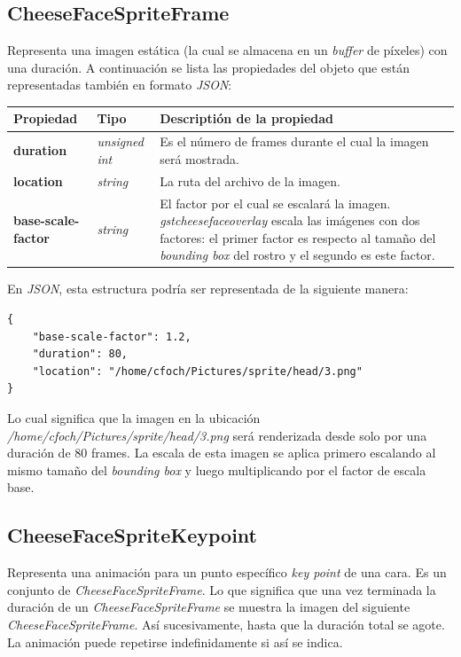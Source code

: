 \documentclass[a4paper,openright,12pt]{report}
\begin{document}
\subsection{CheeseFaceSpriteFrame}
Representa una imagen estática (la cual se almacena en un \textit{buffer} de
píxeles) con una duración. A continuación se lista las propiedades del objeto
que están representadas también en formato \textit{JSON}:

\begin{center}
  \begin{longtable}{| p{} | p{} | p{} |}
  \hline

  \textbf{Propiedad} &
  \textbf{Tipo} &
  \textbf{Descriptión de la propiedad}
  \\ \hline

  \textbf{duration} &
  \textit{unsigned int} &
  Es el número de frames durante el cual la imagen será mostrada.
  \\ \hline

  \textbf{location} &
  \textit{string} &
  La ruta del archivo de la imagen.
  \\ \hline

  \textbf{base-scale-factor} &
  \textit{string} &
  El factor por el cual se escalará la imagen. \textit{gstcheesefaceoverlay}
  escala las imágenes con dos factores: el primer factor es respecto al tamaño
  del \textit{bounding box} del rostro y el segundo es este factor.
  \\ \hline
  \end{longtable}
\end{center}

En \textit{JSON}, esta estructura podría ser representada de la siguiente
manera:\\
\begin{verbatim}
{
    "base-scale-factor": 1.2,
    "duration": 80,
    "location": "/home/cfoch/Pictures/sprite/head/3.png"
}
\end{verbatim}

Lo cual significa que la imagen en la ubicación
\textit{/home/cfoch/Pictures/sprite/head/3.png} será renderizada desde solo por
una duración de 80 frames. La escala de esta imagen se aplica primero escalando
al mismo tamaño del \textit{bounding box} y luego multiplicando por el factor de
escala base.\\

\subsection{CheeseFaceSpriteKeypoint}
Representa una animación para un punto específico \textit{key point} de una
cara. Es un conjunto de \textit{CheeseFaceSpriteFrame}. Lo que significa que una
vez terminada la duración de un \textit{CheeseFaceSpriteFrame} se muestra la
imagen del siguiente \textit{CheeseFaceSpriteFrame}. Así sucesivamente, hasta
que la duración total se agote. La animación puede repetirse indefinidamente si
así se indica.
\end{document}
